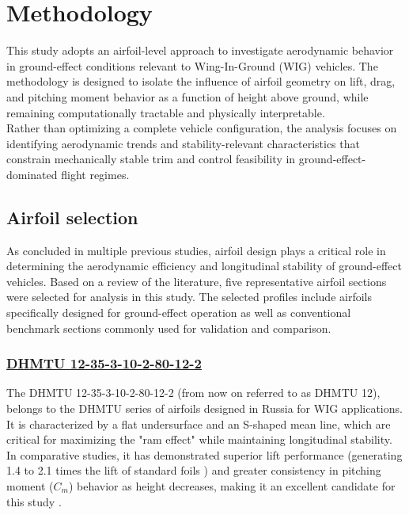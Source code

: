 \section{Methodology}

This study adopts an airfoil-level approach to investigate aerodynamic behavior in ground-effect conditions relevant to Wing-In-Ground (WIG) vehicles. The methodology is designed to isolate the influence of airfoil geometry on lift, drag, and pitching moment behavior as a function of height above ground, while remaining computationally tractable and physically interpretable.\\

\noindent Rather than optimizing a complete vehicle configuration, the analysis focuses on identifying aerodynamic trends and stability-relevant characteristics that constrain mechanically stable trim and control feasibility in ground-effect-dominated flight regimes.

\subsection{Airfoil selection}

As concluded in multiple previous studies, airfoil design plays a critical role in determining the aerodynamic efficiency and longitudinal stability of ground-effect vehicles. Based on a review of the literature, five representative airfoil sections were selected for analysis in this study. The selected profiles include airfoils specifically designed for ground-effect operation as well as conventional benchmark sections commonly used for validation and comparison.

\subsubsection*{\underline{DHMTU 12-35-3-10-2-80-12-2}}

The DHMTU 12-35-3-10-2-80-12-2 (from now on referred to as DHMTU 12), belongs to the DHMTU series of airfoils designed in Russia for WIG applications. It is characterized by a flat undersurface and an S-shaped mean line, which are critical for maximizing the "ram effect" while maintaining longitudinal stability. In comparative studies, it has demonstrated superior lift performance (generating 1.4 to 2.1 times the lift of standard foils \cite{Conference_paper_DHMTU}) and greater consistency in pitching moment ($C_m$) behavior as height decreases, making it an excellent candidate for this study \cite{ASME_CFD_simulation}.

